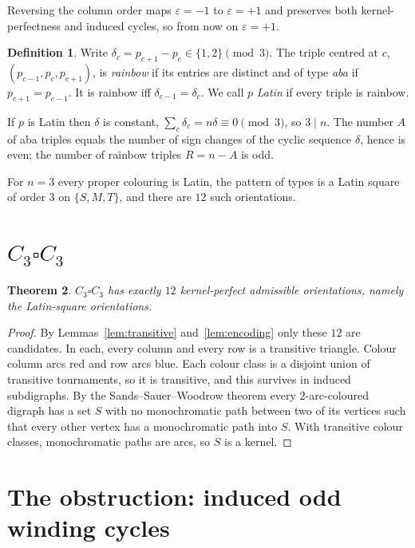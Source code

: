\documentclass[11pt]{article}
\theoremstyle{plain}
\newtheorem{theorem}{Theorem}
\theoremstyle{definition}
\newtheorem{definition}[theorem]{Definition}
\theoremstyle{remark}
\begin{document}
Reversing the column order maps $\varepsilon=-1$ to $\varepsilon=+1$ and preserves both
kernel-perfectness and induced cycles, so from now on $\varepsilon=+1$.

\begin{definition}
Write $\delta_c=p_{c+1}-p_c\in\{1,2\}\pmod 3$. The triple centred at $c$,
$(p_{c-1},p_c,p_{c+1})$, is \emph{rainbow} if its entries are distinct and of type
\emph{aba} if $p_{c+1}=p_{c-1}$. It is rainbow iff $\delta_{c-1}=\delta_c$. We call $p$
\emph{Latin} if every triple is rainbow.
\end{definition}

If $p$ is Latin then $\delta$ is constant, $\sum_c\delta_c=n\delta\equiv 0\pmod 3$, so
$3\mid n$. The number $A$ of aba triples equals the number of sign changes of the cyclic
sequence $\delta$, hence is even; the number of rainbow triples $R=n-A$ is odd.

For $n=3$ every proper colouring is Latin, the pattern of types is a Latin square
of order $3$ on $\{S,M,T\}$, and there are $12$ such orientations.

\section{\texorpdfstring{$C_3\square C_3$}{C3 x C3}}

\begin{theorem}
$C_3\square C_3$ has exactly $12$ kernel-perfect admissible orientations, namely the
Latin-square orientations.
\end{theorem}
\begin{proof}
By Lemmas~\ref{lem:transitive} and~\ref{lem:encoding} only these $12$ are candidates.
In each, every column and every row is a transitive triangle. Colour column arcs red and
row arcs blue. Each colour class is a disjoint union of transitive tournaments, so it is
transitive, and this survives in induced subdigraphs. By the Sands--Sauer--Woodrow
theorem every $2$-arc-coloured digraph has a set $S$ with no monochromatic path between
two of its vertices such that every other vertex has a monochromatic path into $S$.
With transitive colour classes, monochromatic paths are arcs, so $S$ is a kernel.
\end{proof}

\section{The obstruction: induced odd winding cycles}
\end{document}
